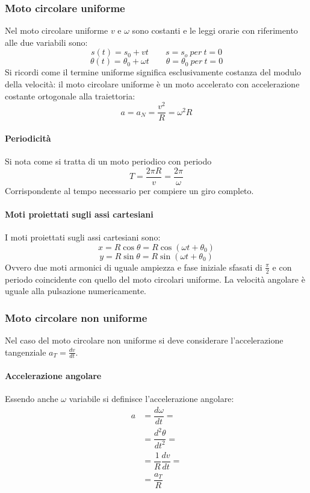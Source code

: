		\subsubsection{Moto circolare uniforme}
		Nel moto circolare uniforme $v$ e $\omega$ sono costanti e le leggi orarie con riferimento alle due variabili sono:
		$$s(t)=s_0+vt\qquad s= s_o\ per\ t=0$$
		$$\theta(t)=\theta_0+\omega t\qquad \theta=\theta_0\ per\ t = 0$$
		Si ricordi come il termine uniforme significa esclusivamente costanza del modulo della velocit\`a: il moto circolare uniforme \`e un moto accelerato con accelerazione costante ortogonale alla traiettoria:
		$$a=a_N=\dfrac{v^2}{R}=\omega^2R$$

			\paragraph{Periodicit\`a}
			Si nota come si tratta di un moto periodico con periodo
			$$T=\dfrac{2\pi R}{v}=\dfrac{2\pi}{\omega}$$
			Corrispondente al tempo necessario per compiere un giro completo.

			\paragraph{Moti proiettati sugli assi cartesiani}
			I moti proiettati sugli assi cartesiani sono:
			$$x=R\cos\theta=R\cos(\omega t+\theta_0)$$
			$$y=R\sin\theta=R\sin(\omega t+\theta_0)$$
			Ovvero due moti armonici di uguale ampiezza e fase iniziale sfasati di $\frac{\pi}{2}$ e con periodo coincidente con quello del moto circolari uniforme.
			La velocit\`a angolare \`e uguale alla pulsazione numericamente.

		\subsubsection{Moto circolare non uniforme}
		Nel caso del moto circolare non uniforme si deve considerare l'accelerazione tangenziale $a_T=\frac{dv}{dt}$.

			\paragraph{Accelerazione angolare}
			Essendo anche $\omega$ variabile si definisce l'accelerazione angolare:
			\begin{align*}
				a&=\dfrac{d\omega}{dt}=\\
				 &=\dfrac{d^2\theta}{dt^2}=\\
				 &=\dfrac{1}{R}\dfrac{dv}{dt}=\\
				 &=\dfrac{a_T}{R}\\
			\end{align*}

